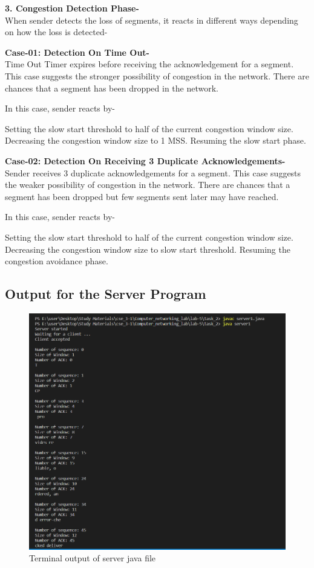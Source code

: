 \documentclass[11pt]{article}
\begin{document}
\textbf{3. Congestion Detection Phase-}\\[12pt]

When sender detects the loss of segments, it reacts in different ways depending on how the loss is detected-

\textbf{Case-01: Detection On Time Out-}\\[2pt]

Time Out Timer expires before receiving the acknowledgement for a segment. This case suggests the stronger possibility of congestion in the network. There are chances that a segment has been dropped in the network.

In this case, sender reacts by-

Setting the slow start threshold to half of the current congestion window size.
Decreasing the congestion window size to 1 MSS.
Resuming the slow start phase.


\textbf{Case-02: Detection On Receiving 3 Duplicate Acknowledgements-}\\[2pt]

Sender receives 3 duplicate acknowledgements for a segment. This case suggests the weaker possibility of congestion in the network. There are chances that a segment has been dropped but few segments sent later may have reached.

In this case, sender reacts by-

Setting the slow start threshold to half of the current congestion window size. Decreasing the congestion window size to slow start threshold. Resuming the congestion avoidance phase.


\subsection{Output for the Server Program}

 \begin{figure}[!h]
\centering
\includegraphics[width=\textwidth]{c_server1.png}
\caption{Terminal output of server java file }
\end{figure}
\FloatBarrier
\end{document}
